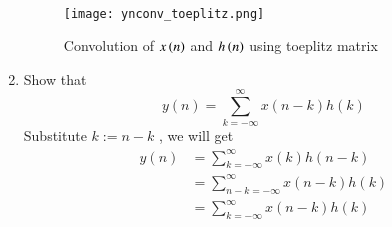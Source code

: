 \documentclass[journal,12pt,twocolumn]{IEEEtran}
\renewcommand\thesection{\arabic{section}}
\begin{document}
\begin{enumerate}[label=\thesection.\arabic*]
\begin{align}
      \end{align}
      \begin{figure}
        \centering
        \texttt{[image: ynconv\_toeplitz.png]}
        \caption{Convolution of $x\left(n\right)$ and $h\left(n\right)$ using toeplitz matrix}
        \label{ynconv_toep}
       \end{figure}
    \item Show that
     \begin{equation}
      y(n) =  \sum_{k=-\infty}^{\infty}x(n-k)h(k)
      \end{equation}
    \solution Substitute $k := n-k$ , we will get 
     \begin{align}
       y(n) &= \sum_{k=-\infty}^{\infty}x(k)h(n-k)\\
            &= \sum_{n - k=-\infty}^{\infty}x(n-k)h(k)\\
            &= \sum_{k = -\infty}^{\infty}x(n-k)h(k)
     \end{align}
       
\end{enumerate}
\end{document}

